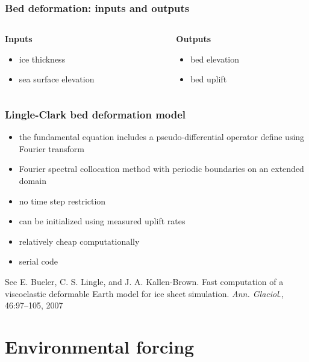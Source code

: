 \documentclass[hide notes,intlimits]{beamer}
\begin{document}
\begin{frame}
  \frametitle{Bed deformation: inputs and outputs}

  \begin{columns}[t]
    \begin{column}{0.5\linewidth}
      \textbf{Inputs}

      \begin{itemize}
      \item ice thickness
      \item sea surface elevation
      \end{itemize}
    \end{column}
    \begin{column}{0.5\linewidth}
      \textbf{Outputs}

      \begin{itemize}
      \item bed elevation
      \item bed uplift
      \end{itemize}
    \end{column}
  \end{columns}
\end{frame}

\begin{frame}
  \frametitle{Lingle-Clark bed deformation model}

  \begin{itemize}
  \item the fundamental equation includes a pseudo-differential
    operator define using Fourier transform
  \item Fourier spectral collocation method with periodic boundaries
    on an extended domain
  \item no time step restriction
  \item can be initialized using measured uplift rates
  \item relatively cheap computationally
  \item serial code
  \end{itemize}

  See E. Bueler, C. S. Lingle, and J. A. Kallen-Brown. Fast
  computation of a viscoelastic deformable Earth model for ice sheet
  simulation. \emph{Ann. Glaciol}., 46:97–105, 2007
\end{frame}

\section{Environmental forcing}
\label{sec:environment}
\end{document}
